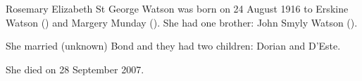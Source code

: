 \biohead{}{}

Rosemary Elizabeth St George Watson was born on	24 August 1916 	to Erskine Watson () and Margery Munday (). She had one brother:  John Smyly Watson ().

She married (unknown) Bond and they had two children: Dorian and D'Este.

She died on 28 September 2007.
